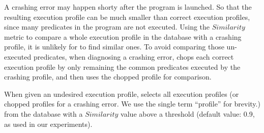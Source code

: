 







A crashing error may happen shorty after the program is launched.
So that the resulting execution profile can be much smaller than correct execution profiles,
since many predicates in the program are not executed.
Using the $Similarity$ metric to compare a whole execution profile in the database
with a crashing profile, it is unlikely for \ourtool to find similar ones.
To avoid comparing those un-executed predicates,
when diagnosing a crashing error, \ourtool
chops each correct execution profile by only remaining
the common predicates executed by the crashing profile, and then
uses the chopped profile for comparison. 

When given an undesired execution profile,
\ourtool selects all execution profiles (or chopped profiles for
a crashing error. We use the single term ``profile'' for brevity.) from the database
with a $Similarity$ value above a threshold (default value: 0.9, as used in our
experiments).




